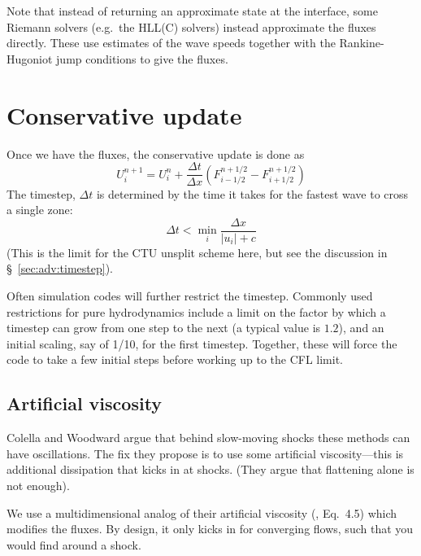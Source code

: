 Note that instead of returning an approximate state at the interface,
some Riemann solvers (e.g.\ the HLL(C) solvers) instead approximate
the fluxes directly.  These use estimates of the wave speeds together
with the Rankine-Hugoniot jump conditions to give the fluxes.


\section{Conservative update}

Once we have the fluxes, the conservative update is done as
\begin{equation}
U^{n+1}_i = U^n_i + \frac{\Delta t}{\Delta x} 
   \left ( F_{i-1/2}^{n+1/2} - F_{i+1/2}^{n+1/2} \right )
\end{equation}
The timestep, $\Delta t$ is determined by the time it takes for the
fastest wave to cross a single zone:
\begin{equation}
\Delta t < \min_i \frac{\Delta x}{|u_i| + c}
\end{equation}
(This is the limit for the CTU unsplit scheme here, but see the discussion
in \S~\ref{sec:adv:timestep}).

Often simulation codes will further restrict the timestep.  Commonly
used restrictions for pure hydrodynamics include a limit on the factor
by which a timestep can grow from one step to the next (a typical
value is $1.2$), and an initial scaling, say of 1/10, for the first
timestep.  Together, these will force the code to take a few initial
steps before working up to the CFL limit.

\subsection{Artificial viscosity}

Colella and Woodward argue that behind slow-moving shocks these
methods can have oscillations.  The fix they propose is to use some
artificial viscosity---this is additional dissipation that kicks in at
shocks.  (They argue that flattening alone is not enough).

We use a multidimensional analog of their artificial viscosity
(\cite{colellawoodward:1984}, Eq.\ 4.5) which modifies the fluxes.  By
design, it only kicks in for converging flows, such that you would
find around a shock.


